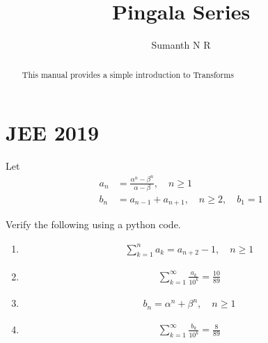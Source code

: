 \documentclass[journal,12pt,twocolumn]{IEEEtran}
\renewcommand\thesection{\arabic{section}}
\begin{document}
\let\StandardTheFigure\thefigure
\renewcommand{\thefigure}{\theproblem}

\def\putbox#1#2#3{\makebox[0in][l]{\makebox[#1][l]{}\raisebox{\baselineskip}[0in][0in]{\raisebox{#2}[0in][0in]{#3}}}}
\def\rightbox#1{\makebox[0in][r]{#1}}
\def\centbox#1{\makebox[0in]{#1}}
\def\topbox#1{\raisebox{-\baselineskip}[0in][0in]{#1}}
\def\midbox#1{\raisebox{-0.5\baselineskip}[0in][0in]{#1}}

\vspace{3cm}

\title{ Pingala Series }
\author{ Sumanth N R }
\maketitle

\tableofcontents

\renewcommand{\thefigure}{\theenumi}
\renewcommand{\thetable}{\theenumi}

\bigskip

\begin{abstract}
This manual provides a simple introduction to Transforms
\end{abstract}



\section{JEE 2019}
Let 
\begin{align}
	a_n &= \frac{\alpha^{n}-\beta^{n}}{\alpha - \beta}, \quad n \ge 1 \\
	b_n &= a_{n-1} + a_{n+1}, \quad n \ge 2, \quad b_1 =1
	\label{eq:10-orig-diff}
\end{align}

Verify the following using a python code.

\begin{enumerate}[label=\thesection.\arabic*,ref=\thesection.\theenumi]
\item \begin{align}
		\sum_{k=1}^{n}a_k = a_{n+2}-1, \quad n \ge 1
	\end{align}
\item \begin{align}
		\sum_{k=1}^{\infty}\frac{a_k}{10^k} =\frac{10}{89}
	\end{align}
\item \begin{align}
		b_n =\alpha^n + \beta^n, \quad n \ge 1
	\end{align}
\item \begin{align}
		\sum_{k=1}^{\infty}\frac{b_k}{10^k} =\frac{8}{89}
	\end{align}
\end{enumerate}
\end{document}
